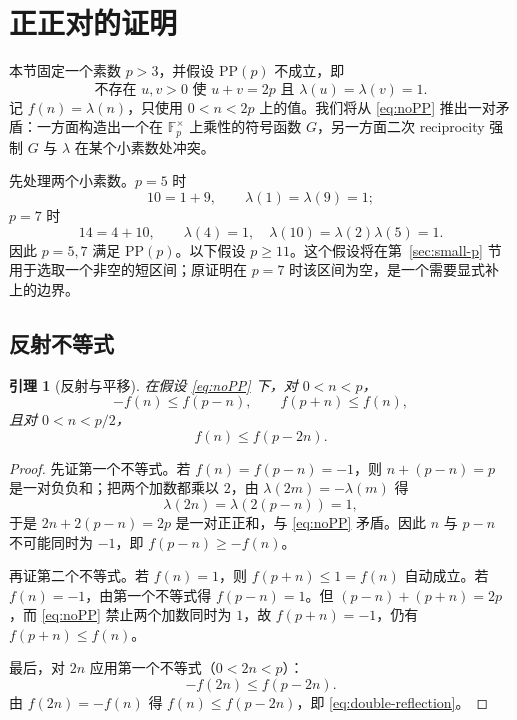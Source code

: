 \documentclass[11pt,a4paper]{ctexart}
\theoremstyle{plain}
\newtheorem{lemma}[theorem]{引理}
\theoremstyle{definition}
\newcommand{\Fpx}{\mathbb{F}_p^{\times}}
\newcommand{\li}{\lambda}
\newcommand{\PP}{\mathrm{PP}}
\begin{document}
\section{正正对的证明}
\label{sec:proof}

本节固定一个素数 $p>3$，并假设 $\PP(p)$ 不成立，即
\begin{equation}
  \text{不存在 }u,v>0\text{ 使 }u+v=2p\text{ 且 }\li(u)=\li(v)=1.
  \label{eq:noPP}
\end{equation}
记 $f(n)=\li(n)$，只使用 $0<n<2p$ 上的值。我们将从 \eqref{eq:noPP} 推出一对矛盾：一方面构造出一个在 $\Fpx$ 上乘性的符号函数 $G$，另一方面二次 reciprocity 强制 $G$ 与 $\li$ 在某个小素数处冲突。

先处理两个小素数。$p=5$ 时
\[
  10=1+9,\qquad \li(1)=\li(9)=1;
\]
$p=7$ 时
\[
  14=4+10,\qquad \li(4)=1,\quad \li(10)=\li(2)\li(5)=1.
\]
因此 $p=5,7$ 满足 $\PP(p)$。以下假设 $p\ge11$。这个假设将在第~\ref{sec:small-p} 节用于选取一个非空的短区间；原证明在 $p=7$ 时该区间为空，是一个需要显式补上的边界。

\subsection{反射不等式}
\label{sec:reflection}

\begin{lemma}[反射与平移]
\label{lem:reflection}
在假设 \eqref{eq:noPP} 下，对 $0<n<p$，
\begin{equation}
  -f(n)\le f(p-n),\qquad f(p+n)\le f(n),
  \label{eq:reflection}
\end{equation}
且对 $0<n<p/2$，
\begin{equation}
  f(n)\le f(p-2n).
  \label{eq:double-reflection}
\end{equation}
\end{lemma}

\begin{proof}
先证第一个不等式。若 $f(n)=f(p-n)=-1$，则 $n+(p-n)=p$ 是一对负负和；把两个加数都乘以 $2$，由 $\li(2m)=-\li(m)$ 得
\[
  \li(2n)=\li(2(p-n))=1,
\]
于是 $2n+2(p-n)=2p$ 是一对正正和，与 \eqref{eq:noPP} 矛盾。因此 $n$ 与 $p-n$ 不可能同时为 $-1$，即 $f(p-n)\ge -f(n)$。

再证第二个不等式。若 $f(n)=1$，则 $f(p+n)\le1=f(n)$ 自动成立。若 $f(n)=-1$，由第一个不等式得 $f(p-n)=1$。但 $(p-n)+(p+n)=2p$，而 \eqref{eq:noPP} 禁止两个加数同时为 $1$，故 $f(p+n)=-1$，仍有 $f(p+n)\le f(n)$。

最后，对 $2n$ 应用第一个不等式（$0<2n<p$）：
\[
  -f(2n)\le f(p-2n).
\]
由 $f(2n)=-f(n)$ 得 $f(n)\le f(p-2n)$，即 \eqref{eq:double-reflection}。
\end{proof}
\end{document}
